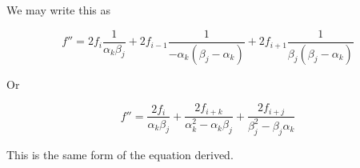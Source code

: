 \documentclass[11pt]{article}
\begin{document}
We may write this as

\begin{equation}
  f''
  =
  2 f_i \frac{1}{\alpha_k \beta_j}
  +
  2 f_{i-1}
  \frac{1}{-\alpha_k (\beta_j-\alpha_k)}
  + 2 f_{i+1}
  \frac{1}{\beta_j(\beta_j-\alpha_k)}
\end{equation}

Or

\begin{equation}
  f''
  =
  \frac{2 f_i}{\alpha_k \beta_j}
  +
  \frac{2 f_{i+k}}{\alpha_k^2 - \alpha_k \beta_j}
  +
  \frac{2 f_{i+j}}{\beta_j^2 - \beta_j \alpha_k}
\end{equation}

This is the same form of the equation derived.
\end{document}
